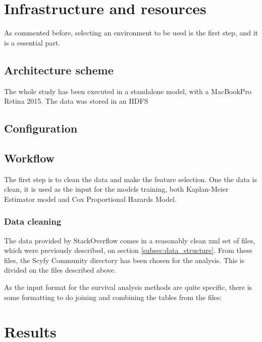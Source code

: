 \documentclass[11pt]{article} %
\begin{document}
\section{Infrastructure and resources}
  \label{sec:infrastructure_and_resources}

  As commented before, selecting an environment to be used is the first step, and it is a essential part.

  \subsection{Architecture scheme}

    The whole study has been executed in a standalone model, with a MacBookPro Retina 2015. The data was stored in an HDFS

  \subsection{Configuration}



  \subsection{Workflow}

    The first step is to clean the data and make the feature selection. One the data is clean, it is used as the input for the models training, both Kaplan-Meier Estimator model and Cox Proportional Hazards Model.

  \subsubsection{Data cleaning}
    The data provided by StackOverflow comes in a reasonably clean xml set of files, which were previously described, on section \ref{subsec:data_structure}. From these files, the Scyfy Community directory has been chosen for the analysis. This is divided on the files described above.

    As the input format for the survival analysis methods are quite specific, there is some formatting to do joining and combining the tables from the files:





\section{Results}
  \label{sec:results}
\end{document}
